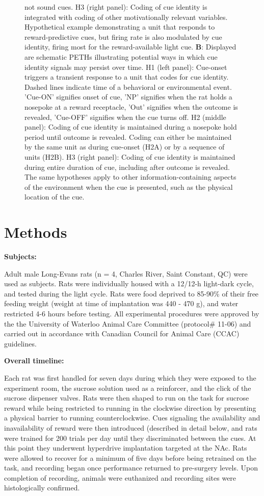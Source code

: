 \documentclass[11pt]{article}
\newcommand{\bsf}[1]{\textbf{#1}}
\begin{document}
\begin{figure}[h]
{  not sound cues. H3 (right panel): Coding of cue identity is integrated with
  coding of other motivationally relevant variables. Hypothetical example
  demonstrating a unit that responds to reward-predictive cues, but firing rate
  is also modulated by cue identity, firing most for the reward-available light
  cue. \bsf{B}: Displayed are schematic PETHs illustrating potential ways in
  which cue identity signals may persist over time. H1 (left panel): Cue-onset
  triggers a transient response to a unit that codes for cue identity. Dashed
  lines indicate time of a behavioral or environmental event. 'Cue-ON' signifies
  onset of cue, 'NP' signifies when the rat holds a nosepoke at a reward
  receptacle, 'Out' signifies when the outcome is revealed, 'Cue-OFF' signifies
  when the cue turns off. H2 (middle panel): Coding of cue identity is
  maintained during a nosepoke hold period until outcome is revealed. Coding can
  either be maintained by the same unit as during cue-onset (H2A) or by a
  sequence of units (H2B). H3 (right panel): Coding of cue identity is
  maintained during entire duration of cue, including after outcome is
  revealed. The same hypotheses apply to other information-containing aspects of
  the environment when the cue is presented, such as the physical location of
  the cue.}
\label{fig:schematic}
\end{figure}

\section*{Methods}

{\bf Subjects:}

Adult male Long-Evans rats (n = 4, Charles River, Saint Constant, QC) were used
as subjects. Rats were individually housed with a 12/12-h light-dark cycle, and
tested during the light cycle. Rats were food deprived to 85-90\% of their free
feeding weight (weight at time of implantation was 440 - 470 g), and water
restricted 4-6 hours before testing. All experimental procedures were approved
by the the University of Waterloo Animal Care Committee (protocol\# 11-06) and
carried out in accordance with Canadian Council for Animal Care (CCAC)
guidelines.

{\bf Overall timeline:}

Each rat was first handled for seven days during which they were exposed to the
experiment room, the sucrose solution used as a reinforcer, and the click of the
sucrose dispenser valves. Rats were then shaped to run on the task for sucrose
reward while being restricted to running in the clockwise direction by
presenting a physical barrier to running counterclockwise. Cues signaling the
availability and inavailability of reward were then introduced (described in
detail below, and rats were trained for 200 trials per day until they
discriminated between the cues. At this point they underwent hyperdrive
implantation targeted at the NAc. Rats were allowed to recover for a minimum of
five days before being retrained on the task, and recording began once
performance returned to pre-surgery levels. Upon completion of recording,
animals were euthanized and recording sites were histologically confirmed.
\end{document}
